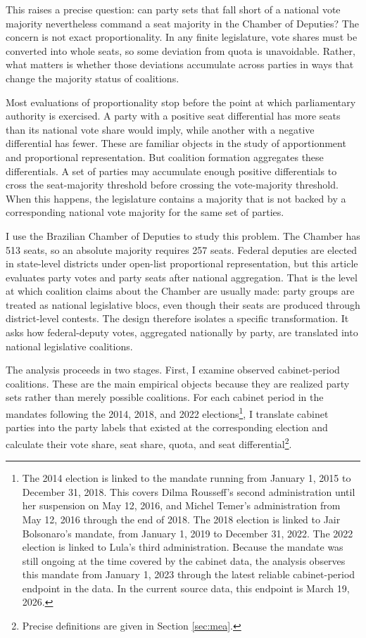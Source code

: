 \documentclass[11pt]{article}
\begin{document}
This raises a precise question: can party sets that fall short of a national
vote majority nevertheless command a seat majority in the Chamber of Deputies?
The concern is not exact proportionality. In any finite legislature, vote shares
must be converted into whole seats, so some deviation from quota is unavoidable.
Rather, what matters is whether those deviations accumulate across parties in
ways that change the majority status of coalitions.

Most evaluations of proportionality stop before the point at which parliamentary
authority is exercised. A party with a positive seat differential has more seats
than its national vote share would imply, while another with a negative
differential has fewer. These are familiar objects in the study of apportionment
and proportional representation. But coalition formation aggregates these
differentials. A set of parties may accumulate enough positive differentials to
cross the seat-majority threshold before crossing the vote-majority threshold.
When this happens, the legislature contains a majority that is not backed by a
corresponding national vote majority for the same set of parties.

I use the Brazilian Chamber of Deputies to study this problem. The Chamber has
513 seats, so an absolute majority requires 257 seats. Federal deputies are
elected in state-level districts under open-list proportional representation, but
this article evaluates party votes and party seats after national aggregation.
That is the level at which coalition claims about the Chamber are usually made:
party groups are treated as national legislative blocs, even though their seats
are produced through district-level contests. The design therefore isolates a
specific transformation. It asks how federal-deputy votes, aggregated nationally
by party, are translated into national legislative coalitions.

The analysis proceeds in two stages. First, I examine observed cabinet-period
coalitions. These are the main empirical objects because they are realized party
sets rather than merely possible coalitions. For each cabinet period in the
mandates following the 2014, 2018, and 2022 elections\footnote{The 2014 election is linked to the mandate running from January 1, 2015 to December 31, 2018. This covers Dilma Rousseff’s second administration until her suspension on May 12, 2016, and Michel Temer’s administration from May 12, 2016 through the end of 2018. The 2018 election is linked to Jair Bolsonaro’s mandate, from January 1, 2019 to December 31, 2022. The 2022 election is linked to Lula’s third administration. Because the mandate was still ongoing at the time covered by the cabinet data, the analysis observes this mandate from January 1, 2023 through the latest reliable cabinet-period endpoint in the data. In the current source data, this endpoint is March 19, 2026.}, I translate cabinet
parties into the party labels that existed at the corresponding election and
calculate their vote share, seat share, quota, and seat
differential\footnote{Precise definitions are given in Section \ref{sec:mea}.}.
\end{document}
